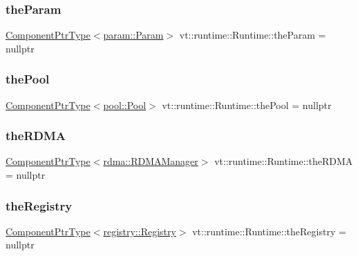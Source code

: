 \subsubsection{\texorpdfstring{the\+Param}{theParam}}
{\footnotesize\ttfamily \hyperlink{structvt_1_1runtime_1_1_runtime_a0893bf0a8c03b898e8ab66b52cec80ad}{Component\+Ptr\+Type}$<$\hyperlink{structvt_1_1param_1_1_param}{param\+::\+Param}$>$ vt\+::runtime\+::\+Runtime\+::the\+Param = nullptr}

\mbox{\label{structvt_1_1runtime_1_1_runtime_a060aca8399f1c6499c4676a26db2e39e}} 
\subsubsection{\texorpdfstring{the\+Pool}{thePool}}
{\footnotesize\ttfamily \hyperlink{structvt_1_1runtime_1_1_runtime_a0893bf0a8c03b898e8ab66b52cec80ad}{Component\+Ptr\+Type}$<$\hyperlink{structvt_1_1pool_1_1_pool}{pool\+::\+Pool}$>$ vt\+::runtime\+::\+Runtime\+::the\+Pool = nullptr}

\mbox{\label{structvt_1_1runtime_1_1_runtime_ab8ec604b336a974682b0fec124a4a31b}} 
\subsubsection{\texorpdfstring{the\+R\+D\+MA}{theRDMA}}
{\footnotesize\ttfamily \hyperlink{structvt_1_1runtime_1_1_runtime_a0893bf0a8c03b898e8ab66b52cec80ad}{Component\+Ptr\+Type}$<$\hyperlink{structvt_1_1rdma_1_1_r_d_m_a_manager}{rdma\+::\+R\+D\+M\+A\+Manager}$>$ vt\+::runtime\+::\+Runtime\+::the\+R\+D\+MA = nullptr}

\mbox{\label{structvt_1_1runtime_1_1_runtime_ae68159c1077f342a4a311627fe3be19a}} 
\subsubsection{\texorpdfstring{the\+Registry}{theRegistry}}
{\footnotesize\ttfamily \hyperlink{structvt_1_1runtime_1_1_runtime_a0893bf0a8c03b898e8ab66b52cec80ad}{Component\+Ptr\+Type}$<$\hyperlink{structvt_1_1registry_1_1_registry}{registry\+::\+Registry}$>$ vt\+::runtime\+::\+Runtime\+::the\+Registry = nullptr}


